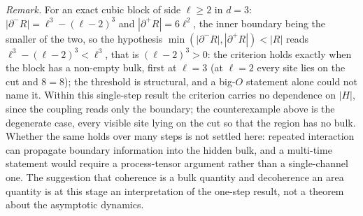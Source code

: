 \documentclass[
]{article}
\begin{document}
\emph{Remark.} For an exact cubic block of side \(\ell \geq 2\) in
\(d = 3\): \(|\partial^{-}R| = \ell^3 - (\ell-2)^3\) and
\(|\partial^{+}R| = 6\ell^2\), the inner boundary being the smaller of
the two, so the hypothesis
\(\min(|\partial^{-}R|, |\partial^{+}R|) < |R|\) reads
\(\ell^3 - (\ell-2)^3 < \ell^3\), that is \((\ell-2)^3 > 0\): the
criterion holds exactly when the block has a non-empty bulk, first at
\(\ell = 3\) (at \(\ell = 2\) every site lies on the cut and \(8 = 8\));
the threshold is structural, and a big-\(O\) statement alone could not
name it. Within this single-step result the criterion carries no
dependence on \(|H|\), since the coupling reads only the boundary; the
counterexample above is the degenerate case, every visible site lying on
the cut so that the region has no bulk. Whether the same holds over many
steps is not settled here: repeated interaction can propagate boundary
information into the hidden bulk, and a multi-time statement would
require a process-tensor argument rather than a single-channel one. The
suggestion that coherence is a bulk quantity and decoherence an area
quantity is at this stage an interpretation of the one-step result, not
a theorem about the asymptotic dynamics.
\end{document}
